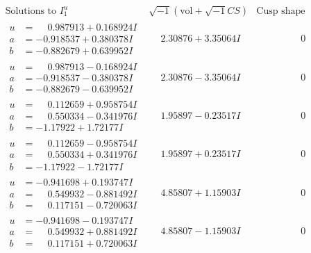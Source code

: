 \documentclass[1p]{elsarticle_modified}
\theoremstyle{definition}
\newcommand{\I}{\sqrt{-1}}
\begin{document}
$$\begin{array}{c|c|c}  
\text{Solutions to }I^u_{1}& \I (\text{vol} + \sqrt{-1}CS) & \text{Cusp shape}\\
 \hline 
\begin{aligned}
u &= \phantom{-}0.987913 + 0.168924 I \\
a &= -0.918537 + 0.380378 I \\
b &= -0.882679 + 0.639952 I\end{aligned}
 & \phantom{-}2.30876 + 3.35064 I & \phantom{-0.000000 } 0 \\ \hline\begin{aligned}
u &= \phantom{-}0.987913 - 0.168924 I \\
a &= -0.918537 - 0.380378 I \\
b &= -0.882679 - 0.639952 I\end{aligned}
 & \phantom{-}2.30876 - 3.35064 I & \phantom{-0.000000 } 0 \\ \hline\begin{aligned}
u &= \phantom{-}0.112659 + 0.958754 I \\
a &= \phantom{-}0.550334 - 0.341976 I \\
b &= -1.17922 + 1.72177 I\end{aligned}
 & \phantom{-}1.95897 - 0.23517 I & \phantom{-0.000000 } 0 \\ \hline\begin{aligned}
u &= \phantom{-}0.112659 - 0.958754 I \\
a &= \phantom{-}0.550334 + 0.341976 I \\
b &= -1.17922 - 1.72177 I\end{aligned}
 & \phantom{-}1.95897 + 0.23517 I & \phantom{-0.000000 } 0 \\ \hline\begin{aligned}
u &= -0.941698 + 0.193747 I \\
a &= \phantom{-}0.549932 - 0.881492 I \\
b &= \phantom{-}0.117151 - 0.720063 I\end{aligned}
 & \phantom{-}4.85807 + 1.15903 I & \phantom{-0.000000 } 0 \\ \hline\begin{aligned}
u &= -0.941698 - 0.193747 I \\
a &= \phantom{-}0.549932 + 0.881492 I \\
b &= \phantom{-}0.117151 + 0.720063 I\end{aligned}
 & \phantom{-}4.85807 - 1.15903 I & \phantom{-0.000000 } 0 \\ \hline\begin{aligned}

\end{aligned}
\end{array}$$
\end{document}
